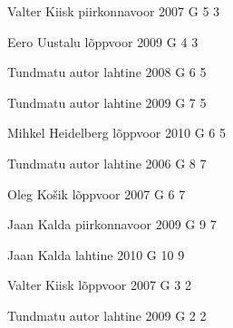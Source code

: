\documentclass[11pt]{article}
\begin{document}
{Valter Kiisk} %
{piirkonnavoor} %
{2007} %
{G 5} %
{3} %
{

\ifEngHint
\fi
}

{Eero Uustalu} %
{lõppvoor} %
{2009} %
{G 4} %
{3} %
{

\ifEngHint
\fi
}

{Tundmatu autor} %
{lahtine} %
{2008} %
{G 6} %
{5} %
{

\ifEngHint
\fi
}

{Tundmatu autor} %
{lahtine} %
{2009} %
{G 7} %
{5} %
{

\ifEngHint
\fi
}

{Mihkel Heidelberg} %
{lõppvoor} %
{2010} %
{G 6} %
{5} %
{

\ifEngHint
\fi
}

{Tundmatu autor} %
{lahtine} %
{2006} %
{G 8} %
{7} %
{

\ifEngHint
\fi
}

{Oleg Košik} %
{lõppvoor} %
{2007} %
{G 6} %
{7} %
{

\ifEngHint
\fi
}

{Jaan Kalda} %
{piirkonnavoor} %
{2009} %
{G 9} %
{7} %
{

\ifEngHint
\fi
}

{Jaan Kalda} %
{lahtine} %
{2010} %
{G 10} %
{9} %
{

\ifEngHint
\fi
}

{Valter Kiisk} %
{lõppvoor} %
{2007} %
{G 3} %
{2} %
{

\ifEngHint
\fi
}

{Tundmatu autor} %
{lahtine} %
{2009} %
{G 2} %
{2} %
{

\ifEngHint
\fi
}
\end{document}

